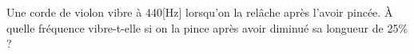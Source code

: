 %
%
    Une corde de violon vibre à 440[Hz] lorsqu'on la relâche après l'avoir pincée. À quelle fréquence vibre-t-elle si on la pince après avoir diminué sa longueur de 25\% ?
